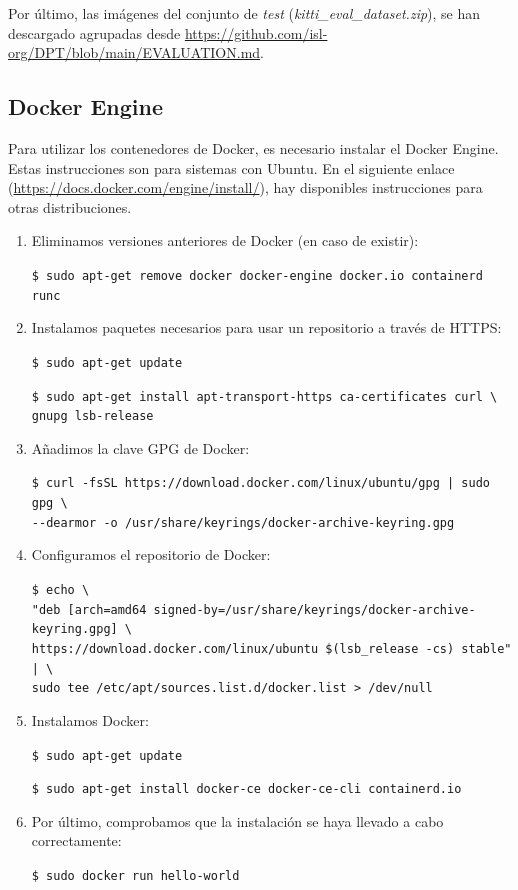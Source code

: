 Por último, las imágenes del conjunto de \textit{test} (\textit{kitti{\_}eval{\_}dataset.zip}), se han descargado agrupadas desde \url{https://github.com/isl-org/DPT/blob/main/EVALUATION.md}.

\subsection{Docker Engine}
Para utilizar los contenedores de Docker, es necesario instalar el Docker Engine. Estas instrucciones son para sistemas con Ubuntu. En el siguiente enlace (\url{https://docs.docker.com/engine/install/}), hay disponibles instrucciones para otras distribuciones.

\begin{enumerate}
\item Eliminamos versiones anteriores de Docker (en caso de existir):

\texttt{\$ sudo apt-get remove docker docker-engine docker.io containerd runc}

\item Instalamos paquetes necesarios para usar un repositorio a través de HTTPS:

\texttt{\$ sudo apt-get update}

\texttt{\$ sudo apt-get install apt-transport-https ca-certificates curl \textbackslash \\ gnupg lsb-release}

\item Añadimos la clave GPG de Docker:

\texttt{\$ curl -fsSL https://download.docker.com/linux/ubuntu/gpg | sudo gpg \textbackslash \\ {-}{-}dearmor -o /usr/share/keyrings/docker-archive-keyring.gpg}

\item Configuramos el repositorio de Docker:

\texttt{\$ echo \textbackslash \\ 
"deb [arch=amd64 signed-by=/usr/share/keyrings/docker-archive-keyring.gpg] \textbackslash \\ 
https://download.docker.com/linux/ubuntu \$(lsb{\_}release -cs) stable"{ }| \textbackslash \\ sudo tee /etc/apt/sources.list.d/docker.list >{ }/dev/null}

\item Instalamos Docker:

\texttt{\$ sudo apt-get update}

\texttt{\$ sudo apt-get install docker-ce docker-ce-cli containerd.io}

\item Por último, comprobamos que la instalación se haya llevado a cabo correctamente:

\texttt{\$ sudo docker run hello-world}


\end{enumerate}

